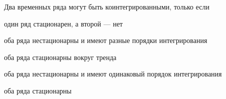 
\begin{question}
Два временных ряда могут быть коинтегрированными, только если
\begin{answerlist}
  \item один ряд стационарен, а второй --- нет
  \item оба ряда нестационарны и имеют разные порядки интегрирования
  \item оба ряда стационарны вокруг тренда
  \item оба ряда нестационарны и имеют одинаковый порядок интегрирования
  \item оба ряда стационарны
\end{answerlist}
\end{question}


